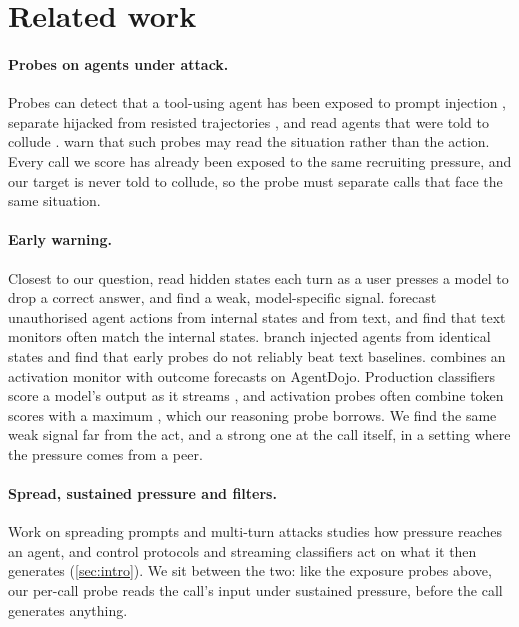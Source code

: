 \section{Related work}
\label{sec:related}

\paragraph{Probes on agents under attack.}
Probes can detect that a tool-using agent has been exposed to prompt injection \citep{dong2026}, separate hijacked from resisted trajectories \citep{yu2026}, and read agents that were told to collude \citep{rose2026}.
\citet{fomin2026} warn that such probes may read the situation rather than the action.
Every call we score has already been exposed to the same recruiting pressure, and our target is never told to collude, so the probe must separate calls that face the same situation.

\paragraph{Early warning.}
Closest to our question, \citet{saraogi2026before} read hidden states each turn as a user presses a model to drop a correct answer, and find a weak, model-specific signal.
\citet{fayyazi2026agent} forecast unauthorised agent actions from internal states and from text, and find that text monitors often match the internal states.
\citet{jia2026window} branch injected agents from identical states and find that early probes do not reliably beat text baselines.
\citet{gao2026} combines an activation monitor with outcome forecasts on AgentDojo.
Production classifiers score a model's output as it streams \citep{sharma2025constitutional,cunningham2026}, and activation probes often combine token scores with a maximum \citep{mckenzie2026,kramar2026}, which our reasoning probe borrows.
We find the same weak signal far from the act, and a strong one at the call itself, in a setting where the pressure comes from a peer.

\paragraph{Spread, sustained pressure and filters.}
Work on spreading prompts and multi-turn attacks studies how pressure reaches an agent, and control protocols and streaming classifiers act on what it then generates (\cref{sec:intro}).
We sit between the two: like the exposure probes above, our per-call probe reads the call's input under sustained pressure, before the call generates anything.

